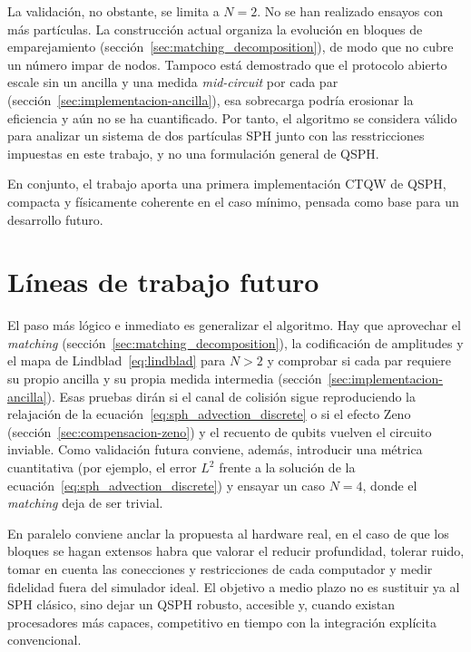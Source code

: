 La validación, no obstante, se limita a $N=2$. No se han realizado ensayos con más partículas. La construcción actual organiza la evolución en bloques de emparejamiento (sección~\ref{sec:matching_decomposition}), de modo que no cubre un número impar de nodos. Tampoco está demostrado que el protocolo abierto escale sin un ancilla y una medida \emph{mid-circuit} por cada par (sección~\ref{sec:implementacion-ancilla}), esa sobrecarga podría erosionar la eficiencia y aún no se ha cuantificado. Por tanto, el algoritmo se considera válido para analizar un sistema de dos partículas SPH junto con las resstricciones impuestas en este trabajo, y no una formulación general de QSPH.

En conjunto, el trabajo aporta una primera implementación CTQW de QSPH, compacta y físicamente coherente en el caso mínimo, pensada como base para un desarrollo futuro.

\section{Líneas de trabajo futuro}

El paso más lógico e inmediato es generalizar el algoritmo. Hay que aprovechar el \emph{matching} (sección~\ref{sec:matching_decomposition}), la codificación de amplitudes y el mapa de Lindblad~\eqref{eq:lindblad} para $N>2$ y comprobar si cada par requiere su propio ancilla y su propia medida intermedia (sección~\ref{sec:implementacion-ancilla}). Esas pruebas dirán si el canal de colisión sigue reproduciendo la relajación de la ecuación~\eqref{eq:sph_advection_discrete} o si el efecto Zeno (sección~\ref{sec:compensacion-zeno}) y el recuento de qubits vuelven el circuito inviable. Como validación futura conviene, además, introducir una métrica cuantitativa (por ejemplo, el error $L^2$ frente a la solución de la ecuación~\eqref{eq:sph_advection_discrete}) y ensayar un caso $N=4$, donde el \emph{matching} deja de ser trivial.

En paralelo conviene anclar la propuesta al hardware real, en el caso de que los bloques se hagan extensos habra que valorar el reducir profundidad, tolerar ruido, tomar en cuenta las conecciones y restricciones de cada computador y medir fidelidad fuera del simulador ideal. El objetivo a medio plazo no es sustituir ya al SPH clásico, sino dejar un QSPH robusto, accesible y, cuando existan procesadores más capaces, competitivo en tiempo con la integración explícita convencional.
